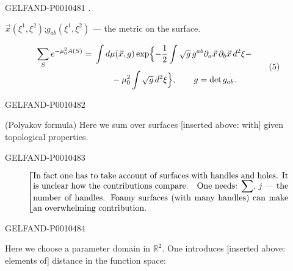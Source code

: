 \begin{GelfandAdjacentEvidence}{GELFAND-P001048}{1}
.

$\vec{x}(\xi^1,\xi^2)$;\quad $g_{ab}(\xi^1,\xi^2)$ — the metric on the surface.

\begin{equation*}
\begin{aligned}
\sum_S e^{-\mu_0^2 A(S)}
={}&\int d\mu(\vec{x},g)\exp\Bigl\{-\frac12\int\sqrt{g}\,g^{ab}
\partial_a\vec{x}\,\partial_b\vec{x}\,d^2\xi{}-\\
&\qquad{}-\mu_{0}^{2}\int\sqrt{g}\,d^2\xi\Bigr\},
\qquad g=\det g_{ab}.
\end{aligned}
\tag{5}
\end{equation*}
\end{GelfandAdjacentEvidence}
\begin{GelfandAdjacentEvidence}{GELFAND-P001048}{2}


(Polyakov formula) Here we sum over surfaces [inserted above: with] given topological properties.
\end{GelfandAdjacentEvidence}
\begin{GelfandAdjacentEvidence}{GELFAND-P001048}{3}


\[
\left[
\begin{minipage}{.87\linewidth}
In fact one has to take account of surfaces with handles and holes.

It is unclear how the contributions compare.\quad One needs: $\displaystyle\sum$, $j$ — the number of handles.

Foamy surfaces (with many handles) can make an overwhelming contribution.
\end{minipage}
\right.
\]
\end{GelfandAdjacentEvidence}
\begin{GelfandAdjacentEvidence}{GELFAND-P001048}{4}


Here we choose a parameter domain in $\mathbb R^2$.
One introduces [inserted above: elements of] distance in the function space:
\end{GelfandAdjacentEvidence}
